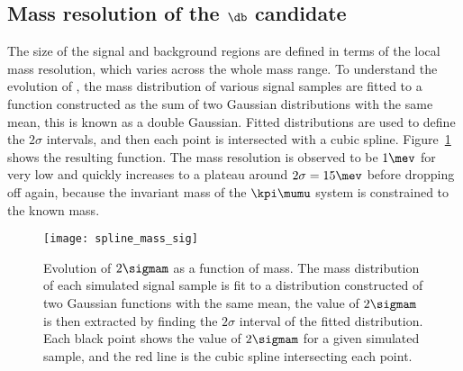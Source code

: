 
\subsection[Mass resolution of the \db candidate]
{Mass resolution of the $\boldsymbol{\db}$ candidate}
The size of the signal and background regions are defined in terms of the local mass resolution,
which varies across the whole mass range.
To understand the evolution of \sigmam, the mass distribution of various signal samples are fitted
to a function constructed as the sum of two Gaussian distributions with the same mean, this is
known as a double Gaussian.
Fitted distributions are used to define the $2\sigma$ intervals, and then each point is
intersected with a cubic spline.
Figure~\ref{fig:param:mass} shows the resulting function.
The mass resolution is observed to be
\approx$1\mev$ for very low \mass{\db} and quickly increases to a plateau around $2\sigma=15\mev$
before dropping off again, because the invariant mass of the $\kpi\mumu$ system is constrained to
the known \Bd mass.

\begin{figure}
  \begin{center}
    \texttt{[image: spline\_mass\_sig]}
    \caption[Evolution of mass resolution with \mass{\db}]
    {
      Evolution of $2\sigmam$ as a function of mass.
      The mass distribution of each simulated signal sample is fit to a distribution constructed of
      two Gaussian functions with the same mean, the value of $2\sigmam$ is then extracted by
      finding the $2\sigma$ interval of the fitted distribution.
      Each black point shows the value of $2\sigmam$ for a given simulated \btokstrdb sample, and
      the red line is the cubic spline intersecting each point.
    }
    \label{fig:param:mass}
  \end{center}
\end{figure}


